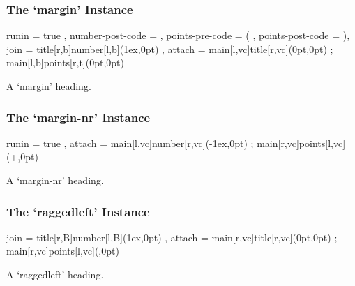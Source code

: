 \documentclass[DIV10,toc=index,toc=bib,numbers=noendperiod]{cnpkgdoc}
\begin{document}
\subsubsection{The `margin' Instance}
\begin{beispiel}
  {
    runin            = true ,
    number-post-code = \space ,
    points-pre-code  = ( ,
    points-post-code = )\space ,
    join             = { title[r,b]number[l,b](1ex,0pt) } ,
    attach           =
      {
        main[l,vc]title[r,vc](0pt,0pt) ;
        main[l,b]points[r,t](0pt,0pt)
      }
  }
\end{beispiel}
\begin{question}{1}
 A `margin' heading. \sample
\end{question}

\subsubsection{The `margin-nr' Instance}
\begin{beispiel}
  {
    runin  = true ,
    attach =
      {
        main[l,vc]number[r,vc](-1ex,0pt) ;
        main[r,vc]points[l,vc](\linewidth+\marginparsep,0pt)
      }
  }
\end{beispiel}
\begin{question}{1}
 A `margin-nr' heading. \sample
\end{question}

\subsubsection{The `raggedleft' Instance}
\begin{beispiel}
  {
    join             = { title[r,B]number[l,B](1ex,0pt) } ,
    attach           =
      {
        main[r,vc]title[r,vc](0pt,0pt) ;
        main[r,vc]points[l,vc](\marginparsep,0pt)
      }
  }
\end{beispiel}
\begin{question}{1}
 A `raggedleft' heading. \sample
\end{question}
\end{document}
